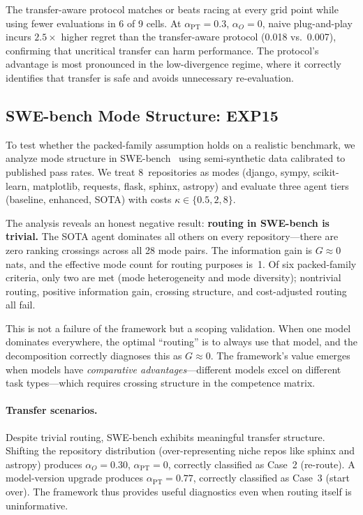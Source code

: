 The transfer-aware protocol matches or beats racing at every grid point
while using fewer evaluations in 6 of 9 cells.  At $\alpha_{\mathrm{PT}}
{=}0.3$, $\alpha_O{=}0$, naive plug-and-play incurs $2.5\times$ higher
regret than the transfer-aware protocol (0.018 vs.\ 0.007), confirming
that uncritical transfer can harm performance.  The protocol's advantage
is most pronounced in the low-divergence regime, where it correctly
identifies that transfer is safe and avoids unnecessary re-evaluation.

\subsection{SWE-bench Mode Structure: EXP15}
\label{sec:exp15}

To test whether the packed-family assumption holds on a realistic
benchmark, we analyze mode structure in SWE-bench~\citep{jimenez2024swebench}
using semi-synthetic data calibrated to published pass rates.  We treat
8~repositories as modes (django, sympy, scikit-learn, matplotlib, requests,
flask, sphinx, astropy) and evaluate three agent tiers (baseline, enhanced,
SOTA) with costs $\kappa \in \{0.5, 2, 8\}$.

The analysis reveals an honest negative result: \textbf{routing in
SWE-bench is trivial.}  The SOTA agent dominates all others on every
repository---there are zero ranking crossings across all 28 mode pairs.
The information gain is $G \approx 0$ nats, and the effective mode count
for routing purposes is~1.  Of six packed-family criteria, only two are
met (mode heterogeneity and mode diversity); nontrivial routing, positive
information gain, crossing structure, and cost-adjusted routing all fail.

This is not a failure of the framework but a scoping validation.  When one
model dominates everywhere, the optimal ``routing'' is to always use that
model, and the decomposition correctly diagnoses this as
$G \approx 0$.  The framework's value emerges when models have
\emph{comparative advantages}---different models excel on different task
types---which requires crossing structure in the competence matrix.

\paragraph{Transfer scenarios.}
Despite trivial routing, SWE-bench exhibits meaningful transfer structure.
Shifting the repository distribution (over-representing niche repos like
sphinx and astropy) produces $\alpha_O = 0.30$, $\alpha_{\mathrm{PT}} = 0$,
correctly classified as Case~2 (re-route).  A model-version upgrade
produces $\alpha_{\mathrm{PT}} = 0.77$, correctly classified as Case~3
(start over).  The framework thus provides useful diagnostics even when
routing itself is uninformative.

